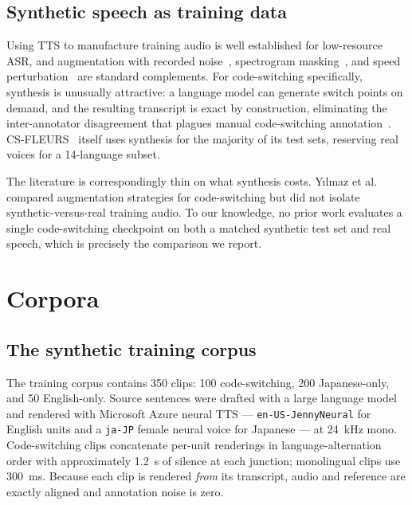 \documentclass[11pt,a4paper]{article}
\begin{document}
\subsection{Synthetic speech as training data}

Using TTS to manufacture training audio is well established for low-resource ASR,
and augmentation with recorded noise~\cite{snyder2015musan},
spectrogram masking~\cite{park2019specaugment}, and speed
perturbation~\cite{ko2015audio} are standard complements. For code-switching
specifically, synthesis is unusually attractive: a language model can generate
switch points on demand, and the resulting transcript is exact by construction,
eliminating the inter-annotator disagreement that plagues manual code-switching
annotation~\cite{yilmaz2018semi}. CS-FLEURS~\cite{yan2025csfleurs} itself uses
synthesis for the majority of its test sets, reserving real voices for a
14-language subset.

The literature is correspondingly thin on what synthesis costs. Y{\i}lmaz et
al.~\cite{yilmaz2018semi} compared augmentation strategies for code-switching but
did not isolate synthetic-versus-real training audio. To our knowledge, no prior
work evaluates a single code-switching checkpoint on both a matched synthetic
test set and real speech, which is precisely the comparison we report.

\section{Corpora}
\label{sec:corpora}

\subsection{The synthetic training corpus}

The training corpus contains 350 clips: 100 code-switching, 200 Japanese-only,
and 50 English-only. Source sentences were drafted with a large language model
and rendered with Microsoft Azure neural TTS --- \texttt{en-US-JennyNeural} for
English units and a \texttt{ja-JP} female neural voice for Japanese --- at
\SI{24}{\kilo\hertz} mono. Code-switching clips concatenate per-unit renderings in
language-alternation order with approximately \SI{1.2}{\second} of silence at each
junction; monolingual clips use \SI{300}{\milli\second}. Because each clip is
rendered \emph{from} its transcript, audio and reference are exactly aligned and
annotation noise is zero.
\end{document}

